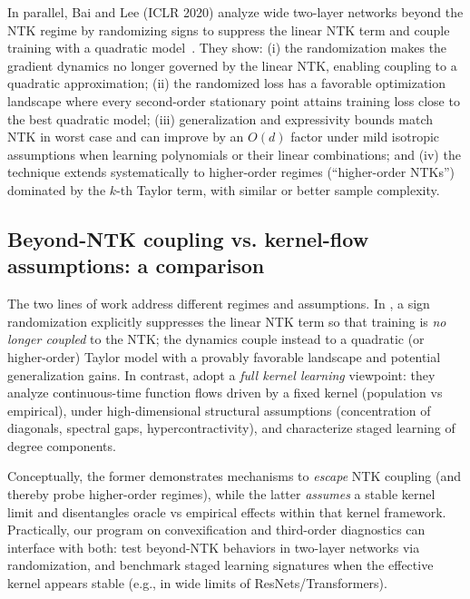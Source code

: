 \documentclass[12pt]{article}
\begin{document}
In parallel, Bai and Lee (ICLR 2020) analyze wide two-layer networks beyond the NTK regime by randomizing signs to suppress the linear NTK term and couple training with a quadratic model~\cite{bai2020beyond}. They show: (i) the randomization makes the gradient dynamics no longer governed by the linear NTK, enabling coupling to a quadratic approximation; (ii) the randomized loss has a favorable optimization landscape where every second-order stationary point attains training loss close to the best quadratic model; (iii) generalization and expressivity bounds match NTK in worst case and can improve by an \(O(d)\) factor under mild isotropic assumptions when learning polynomials or their linear combinations; and (iv) the technique extends systematically to higher-order regimes (``higher-order NTKs'') dominated by the \(k\)-th Taylor term, with similar or better sample complexity.

\subsection{Beyond-NTK coupling vs. kernel-flow assumptions: a comparison}\label{sec:compare-beyond-ntk-kernel}
The two lines of work address different regimes and assumptions. In \cite{bai2020beyond}, a sign randomization explicitly suppresses the linear NTK term so that training is \emph{no longer coupled} to the NTK; the dynamics couple instead to a quadratic (or higher-order) Taylor model with a provably favorable landscape and potential generalization gains. In contrast, \cite{ghosh2021stageslearningdynamicshighdimensional} adopt a \emph{full kernel learning} viewpoint: they analyze continuous-time function flows driven by a fixed kernel (population vs empirical), under high-dimensional structural assumptions (concentration of diagonals, spectral gaps, hypercontractivity), and characterize staged learning of degree components.

Conceptually, the former demonstrates mechanisms to \emph{escape} NTK coupling (and thereby probe higher-order regimes), while the latter \emph{assumes} a stable kernel limit and disentangles oracle vs empirical effects within that kernel framework. Practically, our program on convexification and third-order diagnostics can interface with both: test beyond-NTK behaviors in two-layer networks via randomization, and benchmark staged learning signatures when the effective kernel appears stable (e.g., in wide limits of ResNets/Transformers).
\end{document}

